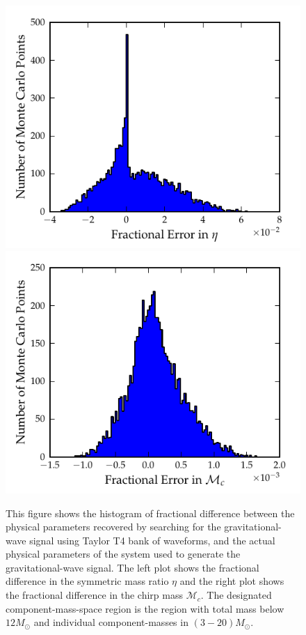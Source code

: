 \documentclass[aps,
prd,
amsmath,
amssymb,
twocolumn,
floatfix,
groupedaddress]{revtex4-1}
\begin{document}
\begin{figure}[]
\centerline{
\includegraphics[scale=0.04, clip=false,keepaspectratio=true, width=\columnwidth]{hist_eta_err12paramT4EOB.pdf}\label{fig:errparams_t4eob_eta}              
\includegraphics[scale=0.04, clip=false, keepaspectratio=true, width=\columnwidth]{hist_mchirp_err12paramT4EOB.pdf}\label{fig:errparams_t4eob_mchirp}
}
\caption{This figure shows the histogram of fractional difference between the physical parameters recovered by searching for the gravitational-wave signal using Taylor T4 bank of waveforms, and the actual physical parameters of the system used to generate the gravitational-wave signal. The left plot shows the fractional difference in the symmetric mass ratio $\eta$ and the right plot shows the fractional difference in the chirp mass $\mathcal{M}_c$. The designated component-mass-space region is the region with total mass below $12M_{\odot}$ and individual component-masses in $(3-20)M_{\odot}$.}
\label{fig:errparams_t4eob}
\end{figure}
\end{document}

